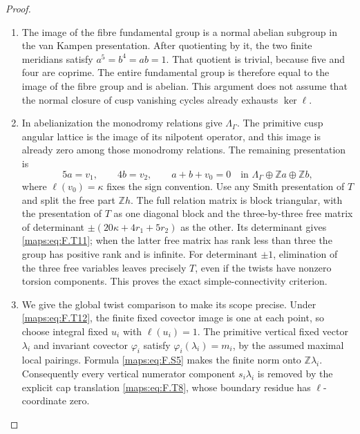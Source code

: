 \begin{proof}
\begin{enumerate}[label=\arabic*.]
\item The image of the fibre fundamental group is a normal
abelian subgroup in the van Kampen presentation.
After quotienting by it, the two finite meridians satisfy
$a^5=b^4=ab=1$.
That quotient is trivial, because five and four are coprime.
The entire fundamental group is therefore equal to the
image of the fibre group and is abelian.
This argument does not assume that the normal closure of
cusp vanishing cycles already exhausts $\ker\ell$.

\item In abelianization the monodromy relations give
$\Lambda_\Gamma$.
The primitive cusp angular lattice is the image of its
nilpotent operator, and this image is already zero among
those monodromy relations.
The remaining presentation is
\[
 5a=v_1,\qquad4b=v_2,\qquad a+b+v_0=0
 \quad\text{in }\Lambda_\Gamma\oplus\mathbb Za\oplus\mathbb Zb,
 \tag{F.T13}\label{maps:eq:F.T13}
\]
where $\ell(v_0)=\kappa$ fixes the sign convention.
Use any Smith presentation of $T$ and split the free part
$\mathbb Zh$.
The full relation matrix is block triangular, with the
presentation of $T$ as one diagonal block and the
three-by-three free matrix of determinant
$\pm(20\kappa+4r_1+5r_2)$ as the other.
Its determinant gives \eqref{maps:eq:F.T11}; when the latter free
matrix has rank less than three the group has positive
rank and is infinite.
For determinant $\pm1$, elimination of the three free
variables leaves precisely $T$, even if the twists have
nonzero torsion components.
This proves the exact simple-connectivity criterion.

\item We give the global twist comparison to make its scope
precise.  Under \eqref{maps:eq:F.T12}, the finite fixed covector image
is one at each point, so choose integral fixed $u_i$ with
$\ell(u_i)=1$.  The primitive vertical fixed vector
$\lambda_i$ and invariant covector $\varphi_i$ satisfy
$\varphi_i(\lambda_i)=m_i$, by the assumed maximal local
pairings.  Formula \eqref{maps:eq:F.S5} makes the finite norm onto
$\mathbb Z\lambda_i$.
Consequently every vertical numerator component
$s_i\lambda_i$ is removed by the explicit cap translation
\eqref{maps:eq:F.T8}, whose boundary residue has $\ell$-coordinate zero.


\end{enumerate}
\end{proof}
